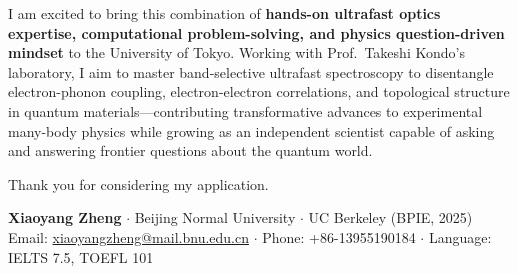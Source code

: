 \documentclass[11pt,a4paper]{article}
\begin{document}
I am excited to bring this combination of \textbf{hands-on ultrafast optics expertise, computational problem-solving, and physics question-driven mindset} to the University of Tokyo. Working with Prof.~Takeshi Kondo's laboratory, I aim to master band-selective ultrafast spectroscopy to disentangle electron-phonon coupling, electron-electron correlations, and topological structure in quantum materials—contributing transformative advances to experimental many-body physics while growing as an independent scientist capable of asking and answering frontier questions about the quantum world.

Thank you for considering my application.

\vspace{3em}

\noindent
\textbf{Xiaoyang Zheng} $\cdot$ Beijing Normal University $\cdot$ UC Berkeley (BPIE, 2025)\\
Email: \href{mailto:xiaoyangzheng@mail.bnu.edu.cn}{xiaoyangzheng@mail.bnu.edu.cn} $\cdot$ Phone: +86-13955190184 $\cdot$ Language: IELTS 7.5, TOEFL 101
\end{document}
